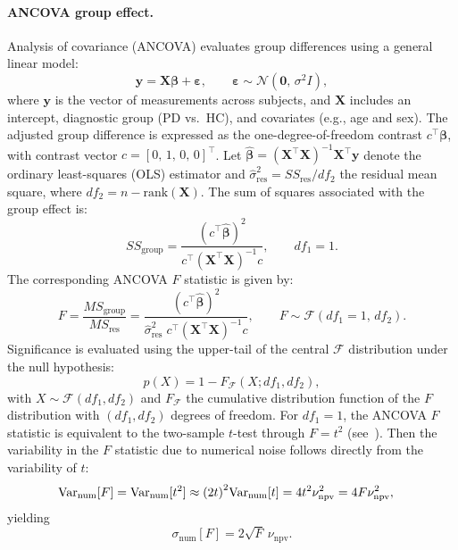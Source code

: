\paragraph{ANCOVA group effect.}

Analysis of covariance (ANCOVA) evaluates group differences using a general
linear model:
\begin{equation*}
    \mathbf{y} = \mathbf{X}\boldsymbol{\beta} + \boldsymbol{\varepsilon},
    \qquad
    \boldsymbol{\varepsilon} \sim \mathcal{N}(\mathbf{0},\, \sigma^2 I),
    \label{eq:ancova-model}
\end{equation*}
where $\mathbf{y}$ is the vector of measurements across subjects, and
$\mathbf{X}$ includes an intercept, diagnostic group (PD vs.\ HC), and
covariates (e.g., age and sex). The adjusted group difference is expressed as
the one-degree-of-freedom contrast $c^{\top}\boldsymbol{\beta}$, with contrast
vector $c = {[0,\, 1,\, 0,\, 0]}^{\top}$. Let $\widehat{\boldsymbol{\beta}} =
    {(\mathbf{X}^{\top}\mathbf{X})}^{-1} \mathbf{X}^{\top}\mathbf{y}$ denote the
ordinary least-squares (OLS) estimator and $\widehat{\sigma}_{\mathrm{res}}^{2}
    = SS_{\mathrm{res}} / df_2$ the residual mean square, where $df_2 = n -
    \mathrm{rank}(\mathbf{X})$. The sum of squares associated with the group effect
is:
\begin{equation*}
    SS_{\mathrm{group}}
    =
    \frac{{(c^{\top}\widehat{\boldsymbol{\beta}})}^{2}}
    {c^{\top}{(\mathbf{X}^{\top}\mathbf{X})}^{-1}c},
    \qquad df_1 = 1.
\end{equation*}
The corresponding ANCOVA $F$ statistic is given by:
\begin{equation*}
    F
    =
    \frac{MS_{\mathrm{group}}}{MS_{\mathrm{res}}}
    =
    \frac{{(c^{\top}\widehat{\boldsymbol{\beta}})}^{2}}
    {\widehat{\sigma}_{\mathrm{res}}^{2}\;
    c^{\top}{(\mathbf{X}^{\top}\mathbf{X})}^{-1}c},
    \qquad
    F \sim \mathcal{F}(df_1 = 1,\, df_2).
    \label{eq:ancova-F}
\end{equation*}
Significance is evaluated using the upper-tail of the central $\mathcal{F}$
distribution under the null hypothesis:
\[
    p(X) = 1 - F_{\mathcal{F}}\left(X;df_1,df_2\right),
\]
with $X \sim \mathcal{F}(df_1, df_2)$ and $F_{\mathcal{F}}$ the cumulative
distribution function of the $F$ distribution with $(df_1, df_2)$ degrees of
freedom. For $df_1 = 1$, the ANCOVA $F$ statistic is equivalent to the
two-sample $t$-test through $F = t^{2}$
(see~\cite[p.~403]{johnson1995continuous}). Then the variability in the $F$
statistic due to numerical noise follows directly from the variability of $t$:
\begin{align*}
    \mathrm{Var}_{\mathrm{num}}[F]
     & = \mathrm{Var}_{\mathrm{num}}[t^{2}]
    \approx { (2t) }^{2}\mathrm{Var}_{\mathrm{num}}[t]
    = 4t^{2}\nu_{\mathrm{npv}}^{2}
    = 4F\nu_{\mathrm{npv}}^{2},
\end{align*}
yielding
\begin{equation}
    \sigma_{\mathrm{num}}[F] = 2\sqrt{F}\,\nu_{\mathrm{npv}}.
    \label{eq:ancova-F-sigma}
\end{equation}

